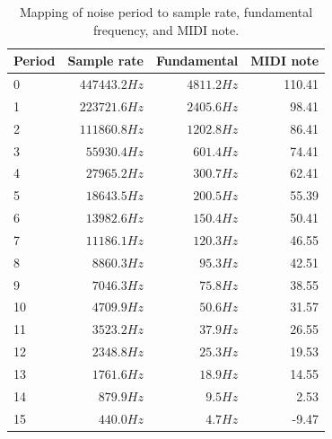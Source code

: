 \documentclass[12pt,a4paper]{article}
\begin{document}
\begin{table}[!htp]
\centering
\caption{Mapping of noise period to sample rate, fundamental frequency, and MIDI note.}
\label{tab:noise-periods}
\begin{tabular}{|l||r|r|r|}
\hline
 Period  & Sample rate   & Fundamental   & MIDI note \\
\hline\hline
 0       & $447443.2 Hz$ & $4811.2 Hz$   & 110.41    \\
 1       & $223721.6 Hz$ & $2405.6 Hz$   & 98.41     \\
 2       & $111860.8 Hz$ & $1202.8 Hz$   & 86.41     \\
 3       & $55930.4 Hz$  & $601.4 Hz$    & 74.41     \\
 4       & $27965.2 Hz$  & $300.7 Hz$    & 62.41     \\
 5       & $18643.5 Hz$  & $200.5 Hz$    & 55.39     \\
 6       & $13982.6 Hz$  & $150.4 Hz$    & 50.41     \\
 7       & $11186.1 Hz$  & $120.3 Hz$    & 46.55     \\
 8       & $8860.3 Hz$   & $95.3 Hz$     & 42.51     \\
 9       & $7046.3 Hz$   & $75.8 Hz$     & 38.55     \\
 10      & $4709.9 Hz$   & $50.6 Hz$     & 31.57     \\
 11      & $3523.2 Hz$   & $37.9 Hz$     & 26.55     \\
 12      & $2348.8 Hz$   & $25.3 Hz$     & 19.53     \\
 13      & $1761.6 Hz$   & $18.9 Hz$     & 14.55     \\
 14      & $879.9 Hz$    & $9.5 Hz$      & 2.53      \\
 15      & $440.0 Hz$    & $4.7 Hz$      & -9.47     \\
\hline
\end{tabular}
\end{table}


\clearpage
\renewcommand\refname{References \& Acknowledgments}
\nocite{*}


\end{document}
